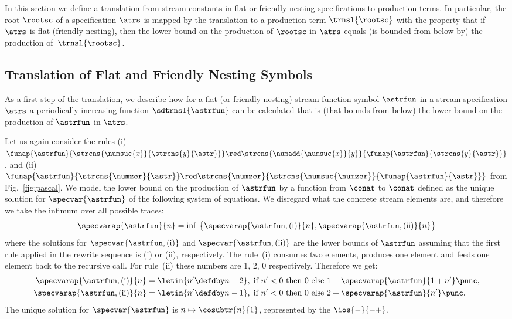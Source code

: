 In this section we define a translation
from stream constants in flat
or friendly nesting specifications to production terms.
In particular, the root $\rootsc$ of a specification $\atrs$
is mapped by the translation to a production term $\trnsl{\rootsc}$
with the property that if\/ $\atrs$ is flat (friendly nesting),
then the \daob{} lower bound on the production of $\rootsc$ in $\atrs$
equals (is bounded from below by)
the production of~$\trnsl{\rootsc}$.

\subsection{Translation of Flat and Friendly Nesting Symbols}\label{sec:translation:subsec:functions}





As a first step of the translation,
we describe how for a flat (or friendly nesting)
stream function symbol $\astrfun$ in a stream specification $\atrs$
a periodically increasing function $\sdtrnsl{\astrfun}$
can be calculated
that is (that bounds from below)
the \daob{} lower bound on the production of $\astrfun$
in $\atrs$. 

Let us again consider the rules
(i)~$\funap{\astrfun}{\strcns{\numsuc{x}}{\strcns{y}{\astr}}}
  \red \strcns{\numadd{\numsuc{x}}{y}}{\funap{\astrfun}{\strcns{y}{\astr}}}$,
and
(ii)~$\funap{\astrfun}{\strcns{\numzer}{\astr}}
  \red \strcns{\numzer}{\strcns{\numsuc{\numzer}}{\funap{\astrfun}{\astr}}}$
  from Fig.~\ref{fig:pascal}.
We model the \daob{} lower bound on the production of $\astrfun$
by a function from $\conat$ to $\conat$ defined as the unique solution for $\specvar{\astrfun}$ of the following system of equations.\label{transl:Pascal:f}
We disregard what the concrete stream elements are,
and therefore we take the infimum over all possible traces:
\[
  \specvarap{\astrfun}{n}
  = \inf\, \big\{ \specvarap{\astrfun,\text{(i)}}{n}, \specvarap{\astrfun,\text{(ii)}}{n} \big\}
\]
where the solutions for $\specvar{\astrfun,\text{(i)}}$ and $\specvar{\astrfun,\text{(ii)}}$
are the \daob{} lower bounds of $\astrfun$ assuming
that the first rule applied in the rewrite sequence is (i) or (ii), respectively.
The rule~(i) consumes two elements, produces one element
and feeds one element back to the recursive call.
For rule~(ii) these numbers are 1, 2, 0 respectively.
Therefore we get:
\begin{align*}
  \specvarap{\astrfun,\text{(i)}}{n}
  & = \letin{n' \defdby n-2},\;
      \text{if $n' < 0$ then $0$ else $1 + \specvarap{\astrfun}{1 + n'}$}
  \punc,
  \\
  \specvarap{\astrfun,\text{(ii)}}{n}
  & = \letin{n' \defdby n-1},\;
      \text{if $n' < 0$ then $0$ else $2 + \specvarap{\astrfun}{n'}$}
  \punc.
\end{align*}
The unique solution for $\specvar{\astrfun}$ is $n \mapsto \cosubtr{n}{1}$,
represented by the \ioterm{} $\ios{-}{-+}$. \label{trans:pascal:f}

